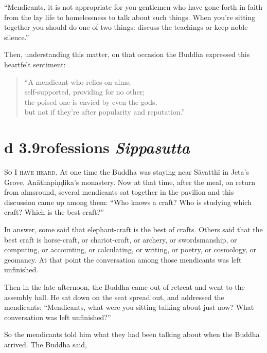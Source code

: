 \documentclass[12pt,openany]{book}%
\newcommand*{\suttatitleacronym}[1]{\smaller[2]{#1}\vspace*{.3em}}
\newcommand*{\suttatitletranslation}[1]{\linebreak{#1}}
\newcommand*{\suttatitleroot}[1]{\linebreak\smaller[2]\itshape{#1}}
\newcommand*{\tocacronym}[1]{\hspace*{-3.3em}{#1}\quad}
\newcommand*{\toctranslation}[1]{#1}
\newcommand*{\tocroot}[1]{(\textit{#1})}
\newcommand*{\scevam}[1]{\textsc{#1}}
\begin{document}
“Mendicants, it is not appropriate for you gentlemen who have gone forth in faith from the lay life to homelessness to talk about such things. When you’re sitting together you should do one of two things: discuss the teachings or keep noble silence.” 

Then, understanding this matter, on that occasion the Buddha expressed this heartfelt sentiment: 

\begin{verse}%
“A mendicant who relies on alms, \\
self-supported, providing for no other; \\
the poised one is envied by even the gods, \\
but not if they’re after popularity and reputation.” 

%
\end{verse}

%
\section*{{\suttatitleacronym Ud 3.9}{\suttatitletranslation Professions }{\suttatitleroot Sippasutta}}
\addcontentsline{toc}{section}{\tocacronym{Ud 3.9} \toctranslation{Professions } \tocroot{Sippasutta}}

\scevam{So I have heard. }At one time the Buddha was staying near \textsanskrit{Sāvatthī} in Jeta’s Grove, \textsanskrit{Anāthapiṇḍika}’s monastery. Now at that time, after the meal, on return from almsround, several mendicants sat together in the pavilion and this discussion came up among them: “Who knows a craft? Who is studying which craft? Which is the best craft?” 

In answer, some said that elephant-craft is the best of crafts. Others said that the best craft is horse-craft, or chariot-craft, or archery, or swordsmanship, or computing, or accounting, or calculating, or writing, or poetry, or cosmology, or geomancy. At that point the conversation among those mendicants was left unfinished. 

Then in the late afternoon, the Buddha came out of retreat and went to the assembly hall. He sat down on the seat spread out, and addressed the mendicants: “Mendicants, what were you sitting talking about just now? What conversation was left unfinished?” 

So the mendicants told him what they had been talking about when the Buddha arrived. The Buddha said, 
\end{document}
